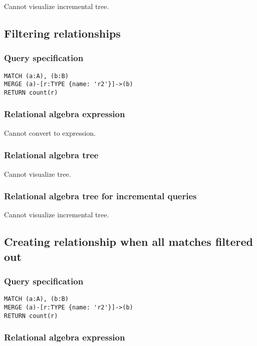 Cannot visualize incremental tree.

\subsection{Filtering relationships}

\subsubsection*{Query specification}

\begin{lstlisting}
MATCH (a:A), (b:B)
MERGE (a)-[r:TYPE {name: 'r2'}]->(b)
RETURN count(r)
\end{lstlisting}

\subsubsection*{Relational algebra expression}

Cannot convert to expression.

\subsubsection*{Relational algebra tree}

Cannot visualize tree.

\subsubsection*{Relational algebra tree for incremental queries}

Cannot visualize incremental tree.

\subsection{Creating relationship when all matches filtered out}

\subsubsection*{Query specification}

\begin{lstlisting}
MATCH (a:A), (b:B)
MERGE (a)-[r:TYPE {name: 'r2'}]->(b)
RETURN count(r)
\end{lstlisting}

\subsubsection*{Relational algebra expression}

